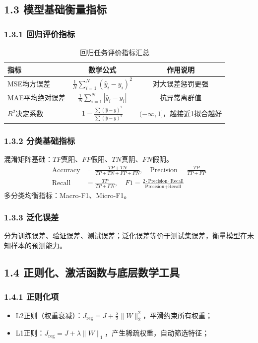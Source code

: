 \documentclass[11pt,a4paper]{article}
\begin{document}
\subsection{1.3 模型基础衡量指标}
\subsubsection{1.3.1 回归评价指标}
\begin{table}[htbp]
\centering
\caption{回归任务评价指标汇总}
\label{tab:reg-metric}
\begin{tabular}{@{}lcc@{}}
\toprule
指标 & 数学公式 & 作用说明 \\
\midrule
MSE均方误差 & $\displaystyle \frac{1}{N}\sum_{i=1}^N (\hat{y}_i-y_i)^2$ & 对大误差惩罚更强 \\
MAE平均绝对误差 & $\displaystyle \frac{1}{N}\sum_{i=1}^N |\hat{y}_i-y_i|$ & 抗异常离群值 \\
$R^2$决定系数 & $\displaystyle 1-\frac{\sum(\hat{y}-y)^2}{\sum(\bar{y}-y)^2}$ & $(-\infty,1]$，越接近1拟合越好 \\
\bottomrule
\end{tabular}
\end{table}

\subsubsection{1.3.2 分类基础指标}
混淆矩阵基础：$TP$真阳、$FP$假阳、$TN$真阴、$FN$假阴。
\begin{align*}
\text{Accuracy} &= \frac{TP+TN}{TP+TN+FP+FN},\quad \text{Precision}=\frac{TP}{TP+FP}\\
\text{Recall} &= \frac{TP}{TP+FN},\quad F1=\frac{2\cdot \text{Precision}\cdot \text{Recall}}{\text{Precision}+\text{Recall}}
\end{align*}
多分类均衡指标：Macro-F1、Micro-F1。

\subsubsection{1.3.3 泛化误差}
分为训练误差、验证误差、测试误差；泛化误差等价于测试集误差，衡量模型在未知样本的预测能力。

\subsection{1.4 正则化、激活函数与底层数学工具}
\subsubsection{1.4.1 正则化项}
\begin{itemize}
\item L2正则（权重衰减）：$J_{\text{reg}}=J+\frac{\lambda}{2}\|W\|_2^2$，平滑约束所有权重；
\item L1正则：$J_{\text{reg}}=J+\lambda\|W\|_1$，产生稀疏权重，自动筛选特征；
\end{itemize}
\end{document}
